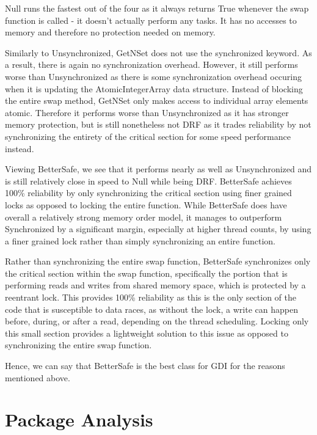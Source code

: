 Null runs the fastest out of the four as it always returns True whenever the swap function is called - it 
doesn't actually perform any tasks. It has no accesses to memory and therefore no 
protection needed on memory.

Similarly to Unsynchronized, GetNSet does not use the synchronized keyword. As a result, there is again
no synchronization overhead. However, it still performs worse than Unsynchronized as there is some 
synchronization overhead occuring when it is updating the AtomicIntegerArray data structure. Instead of blocking
the entire swap method, GetNSet only makes access to individual array elements atomic. Therefore it performs worse
than Unsynchronized as it has stronger memory protection, but is still nonetheless not DRF as it trades reliability by not
synchronizing the entirety of the critical section for some speed performance instead.

Viewing BetterSafe, we see that it performs nearly as well as Unsynchronized and is still relatively
close in speed to Null while being DRF. BetterSafe achieves 100\% reliability by only synchronizing the critical section using finer grained locks as opposed to
locking the entire function. While BetterSafe does have overall a relatively strong memory order model, it manages to
outperform Synchronized by a significant margin, especially at higher thread counts, by using a finer grained lock rather than
simply synchronizing an entire function.

Rather than synchronizing the entire swap function, BetterSafe synchronizes only the critical section within the swap function, specifically the portion that is
performing reads and writes from shared memory space, which is protected by a reentrant lock. This provides 100\% reliability as this is the only section of the
code that is susceptible to data races, as without the lock, a write can happen before, during, or after a read, depending on the thread scheduling. Locking only this
small section provides a lightweight solution to this issue as opposed to synchronizing the entire swap function.

Hence, we can say that BetterSafe is the best class for GDI for the reasons mentioned above.

\newpage

\section{Package Analysis}

